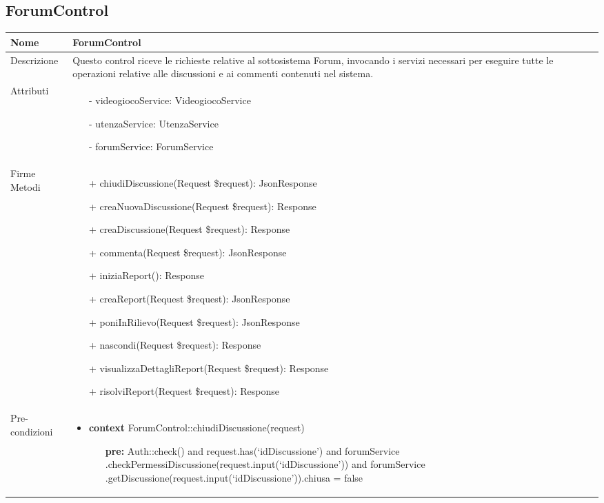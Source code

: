 \subsection{ForumControl}
\small\begin{tabular}{|| l | p{34em} ||} 
	\hline
	Nome & ForumControl\\
	\hline
	Descrizione & Questo control riceve le richieste relative al sottosistema Forum, invocando i servizi necessari per eseguire tutte le operazioni relative alle discussioni e ai commenti contenuti nel sistema. \\
	\hline
	Attributi & \begin{itemize}
		\item[-] videogiocoService: VideogiocoService
		\item[-] utenzaService: UtenzaService
		\item[-] forumService: ForumService
	\end{itemize}\\
	\hline
	Firme Metodi & \begin{itemize}
		\item[+] chiudiDiscussione(Request \$request): JsonResponse
		\item[+] creaNuovaDiscussione(Request \$request): Response
		\item[+] creaDiscussione(Request \$request): Response
		\item[+] commenta(Request \$request): JsonResponse
		\item[+] iniziaReport(): Response
		\item[+] creaReport(Request \$request): JsonResponse
		\item[+] poniInRilievo(Request \$request): JsonResponse
		\item[+] nascondi(Request \$request): Response
		\item[+] visualizzaDettagliReport(Request \$request): Response
		\item[+] risolviReport(Request \$request): Response
	\end{itemize}\\
	\hline
Pre-condizioni & \begin{itemize}[leftmargin=*]
	\item \textbf{context} ForumControl::chiudiDiscussione(request)
	\begin{itemize}
		\item[ ] \textbf{pre:} Auth::check()
		and request.has(‘idDiscussione’)
		and forumService
		  .checkPermessiDiscussione(request.input(‘idDiscussione’))
		and forumService
		  .getDiscussione(request.input(‘idDiscussione’)).chiusa = false	
	\end{itemize}


\end{itemize}
\end{tabular}
